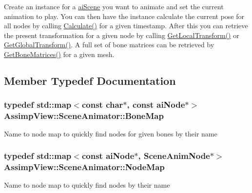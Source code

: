 Create an instance for a \hyperlink{structai_scene}{ai\+Scene} you want to animate and set the current animation to play. You can then have the instance calculate the current pose for all nodes by calling \hyperlink{class_assimp_view_1_1_scene_animator_ac2fca81d4eb40a272065b5cf032db38b}{Calculate()} for a given timestamp. After this you can retrieve the present transformation for a given node by calling \hyperlink{class_assimp_view_1_1_scene_animator_a49d269f5bafdf8c265a1ce0c0d3d6663}{Get\+Local\+Transform()} or \hyperlink{class_assimp_view_1_1_scene_animator_a9b0eba92e2845fa9d5b2412e764c1075}{Get\+Global\+Transform()}. A full set of bone matrices can be retrieved by \hyperlink{class_assimp_view_1_1_scene_animator_aa7dfe2a1c9320bf616bfefefca10f6cd}{Get\+Bone\+Matrices()} for a given mesh. 

\subsection{Member Typedef Documentation}
\hypertarget{class_assimp_view_1_1_scene_animator_a0d705443f7c558756e8816763a2777c2}{
\subsubsection[{Bone\+Map}]{\setlength{\rightskip}{0pt plus 5cm}typedef std\+::map$<$const char$\ast$, const {\bf ai\+Node}$\ast$$>$ {\bf Assimp\+View\+::\+Scene\+Animator\+::\+Bone\+Map}\hspace{0.3cm}{\ttfamily [protected]}}}\label{class_assimp_view_1_1_scene_animator_a0d705443f7c558756e8816763a2777c2}
Name to node map to quickly find nodes for given bones by their name \hypertarget{class_assimp_view_1_1_scene_animator_aa14c2ffd5c92d72e07905ce9a7f43c36}{
\subsubsection[{Node\+Map}]{\setlength{\rightskip}{0pt plus 5cm}typedef std\+::map$<$const {\bf ai\+Node}$\ast$, {\bf Scene\+Anim\+Node}$\ast$$>$ {\bf Assimp\+View\+::\+Scene\+Animator\+::\+Node\+Map}\hspace{0.3cm}{\ttfamily [protected]}}}\label{class_assimp_view_1_1_scene_animator_aa14c2ffd5c92d72e07905ce9a7f43c36}
Name to node map to quickly find nodes by their name 

